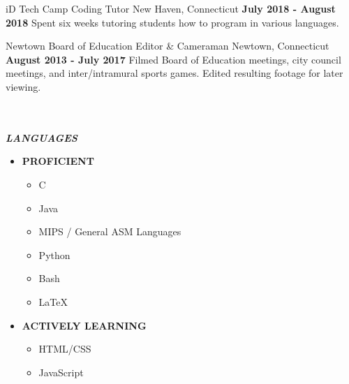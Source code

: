 \documentclass{awesome-cv}
\begin{document}
		\begin{cventries}
			\cventry
				{iD Tech Camp}
				{Coding Tutor}
				{New Haven, Connecticut}
                {\textbf{July 2018 - August 2018}}
				{Spent six weeks tutoring students how to program in various languages.}
				
			\cventry
				{Newtown Board of Education}
				{Editor \& Cameraman}
				{Newtown, Connecticut}
                {\textbf{August 2013 - July 2017}}
				{Filmed Board of Education meetings, city council meetings, and inter/intramural sports games. Edited resulting footage for later viewing.}
		\end{cventries}

	
	\vspace{0.5cm}
	\begin{multicols}{2}

		\\
			\\\textbf{\textit{LANGUAGES}}
			\begin{itemize}[nosep]

				\item \textbf{PROFICIENT}
					\begin{itemize}[nosep]
					\item C
					\item Java
                    \item MIPS / General ASM Languages
					\item Python
					\item Bash
					\item \LaTeX		
				\end{itemize}

				\item \textbf{ACTIVELY LEARNING}
					\begin{itemize}[nosep]
					\item HTML/CSS
					\item JavaScript
				\end{itemize}
			\end{itemize}
				

\end{multicols}
\end{document}
